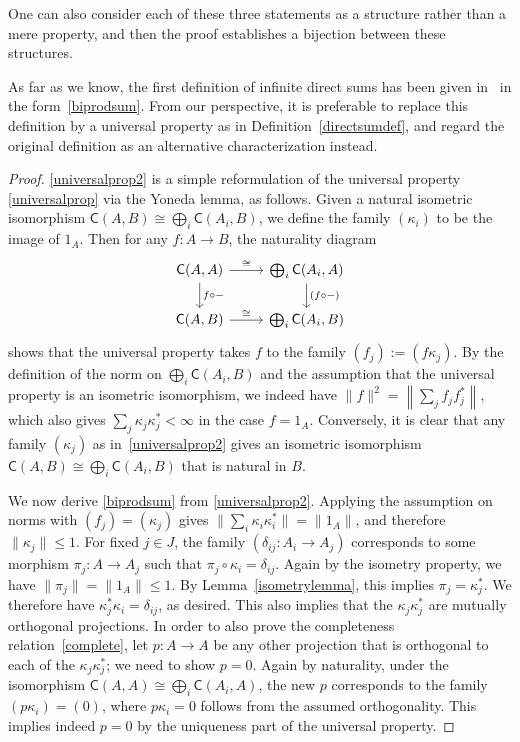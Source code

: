 \documentclass[reqno,T1]{amsproc}
\newcommand{\cat}[1]{\mathsf{#1}}		%
\newcommand{\id}[1]{1_{#1}}			%
\theoremstyle{plain}
\theoremstyle{remark}
\numberwithin{equation}{section}
\begin{document}
One can also consider each of these three statements as a structure rather than a mere property, and then the proof establishes a bijection between these structures.

As far as we know, the first definition of infinite direct sums has been given in~\cite[p.~100]{wstarcat} in the form~\ref{biprodsum}. From our perspective, it is preferable to replace this definition by a universal property as in Definition~\ref{directsumdef}, and regard the original definition as an alternative characterization instead.

\begin{proof}
\ref{universalprop2} is a simple reformulation of the universal property \ref{universalprop} via the Yoneda lemma, as follows. Given a natural isometric isomorphism $\cat{C}(A,B) \cong \bigoplus_i \cat{C}(A_i,B)$, we define the family $(\kappa_i)$ to be the image of $\id{A}$. Then for any $f : A \to B$, the naturality diagram
\[\begin{tikzcd}
	\cat{C}(A,A) \ar{r}{\cong} \ar{d}{f\circ -} & \bigoplus_i \cat{C}(A_i,A) \ar{d}{(f\circ -)} \\
	\cat{C}(A,B) \ar{r}{\cong} & \bigoplus_i \cat{C}(A_i,B)
\end{tikzcd}\]
shows that the universal property takes $f$ to the family $(f_j) := (f\kappa_j)$. By the definition of the norm on $\bigoplus_i \cat{C}(A_i,B)$ and the assumption that the universal property is an isometric isomorphism, we indeed have $\| f \|^2 = \left\| \sum_j f_j f_j^* \right\|$, which also gives $\sum_j \kappa_j \kappa_j^* < \infty$ in the case $f = \id{A}$. Conversely, it is clear that any family $(\kappa_j)$ as in~\ref{universalprop2} gives an isometric isomorphism $\cat{C}(A,B) \cong \bigoplus_i \cat{C}(A_i,B)$ that is natural in $B$.

We now derive \ref{biprodsum} from \ref{universalprop2}. Applying the assumption on norms with $(f_j) = (\kappa_j)$ gives $\| \sum_i \kappa_i \kappa_i^* \| = \| \id{A} \|$, and therefore $\| \kappa_j \| \leq 1$. For fixed $j\in J$, the family $(\delta_{ij} : A_i \to A_j)$ corresponds to some morphism $\pi_j : A \to A_j$ such that $\pi_j\circ\kappa_i = \delta_{ij}$. Again by the isometry property, we have $\| \pi_j \| = \| \id{A} \| \leq 1$. By Lemma~\ref{isometrylemma}, this implies $\pi_j = \kappa_j^*$. We therefore have $\kappa_j^*\kappa_i = \delta_{ij}$, as desired. This also implies that the $\kappa_j \kappa_j^*$ are mutually orthogonal projections. In order to also prove the completeness relation~\eqref{complete}, let $p : A\to A$ be any other projection that is orthogonal to each of the $\kappa_j \kappa_j^*$; we need to show $p = 0$. Again by naturality, under the isomorphism $\cat{C}(A,A) \cong \bigoplus_i \cat{C}(A_i,A)$, the new $p$ corresponds to the family $(p\kappa_i) = (0)$, where $p\kappa_i = 0$ follows from the assumed orthogonality. This implies indeed $p=0$ by the uniqueness part of the universal property.


\end{proof}
\end{document}
